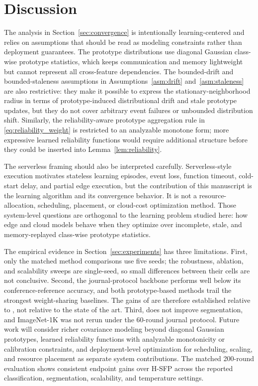 \section{Discussion}
\label{sec:discussion}

The analysis in Section~\ref{sec:convergence} is intentionally learning-centered and relies on assumptions that should be read as modeling constraints rather than deployment guarantees. The prototype distributions use diagonal Gaussian class-wise prototype statistics, which keeps communication and memory lightweight but cannot represent all cross-feature dependencies. The bounded-drift and bounded-staleness assumptions in Assumptions~\ref{asm:drift} and~\ref{asm:staleness} are also restrictive: they make it possible to express the stationary-neighborhood radius in terms of prototype-induced distributional drift and stale prototype updates, but they do not cover arbitrary event failures or unbounded distribution shift. Similarly, the reliability-aware prototype aggregation rule in \eqref{eq:reliability_weight} is restricted to an analyzable monotone form; more expressive learned reliability functions would require additional structure before they could be inserted into Lemma~\ref{lem:reliability}.

The serverless framing should also be interpreted carefully. Serverless-style execution motivates stateless learning episodes, event loss, function timeout, cold-start delay, and partial edge execution, but the contribution of this manuscript is the \ehsfp learning algorithm and its convergence behavior. It is not a resource-allocation, scheduling, placement, or cloud-cost optimization method. Those system-level questions are orthogonal to the learning problem studied here: how edge and cloud models behave when they optimize over incomplete, stale, and memory-replayed class-wise prototype statistics.

The empirical evidence in Section~\ref{sec:experiments} has three limitations. First, only the matched method comparisons use five seeds; the robustness, ablation, and scalability sweeps are single-seed, so small differences between their cells are not conclusive. Second, the journal-protocol \hsfp backbone performs well below its conference-reference accuracy, and both prototype-based methods trail the strongest weight-sharing baselines. The gains of \ehsfp are therefore established relative to \hsfp, not relative to the state of the art. Third, \ehsfp does not improve segmentation, and ImageNet-1K was not rerun under the 60-round journal protocol. Future work will consider richer covariance modeling beyond diagonal Gaussian prototypes, learned reliability functions with analyzable monotonicity or calibration constraints, and deployment-level optimization for scheduling, scaling, and resource placement as separate system contributions. The matched 200-round evaluation shows consistent endpoint gains over H-SFP across the reported classification, segmentation, scalability, and temperature settings.
